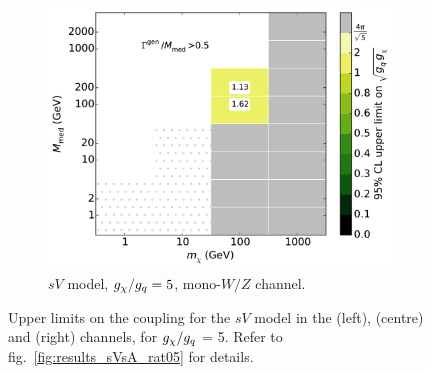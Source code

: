 \begin{figure}
\begin{subfigure}[t]{0.32\textwidth}
    \centering
    \includegraphics[width=1.\textwidth]{figures/grid_basepoints_SVD_rat5_monoWZ.pdf}
    \caption{$sV$ model, $g_{\chi}/g_q = 5$, mono-$W/Z$ channel.}
    \vspace{0.75cm}
  \end{subfigure}
  \caption{Upper limits on the coupling for the $sV$ model in the \monojet (left), \monoZ (centre) and \monoWZ (right) channels, for $g_{\chi} / g_q$ = 5. Refer to fig.~\ref{fig:results_sVsA_rat05} for details.}
  \label{fig:results_sVsA_rat5}
\end{figure}

